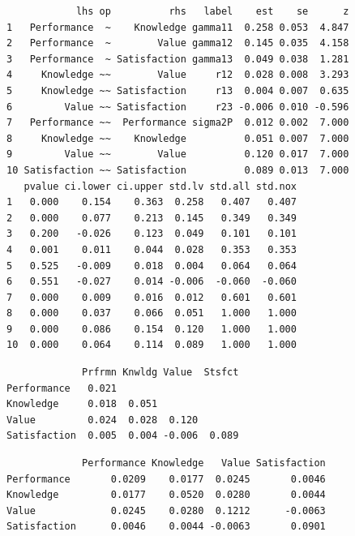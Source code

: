 \begin{verbatim}
            lhs op          rhs   label    est    se      z
1   Performance  ~    Knowledge gamma11  0.258 0.053  4.847
2   Performance  ~        Value gamma12  0.145 0.035  4.158
3   Performance  ~ Satisfaction gamma13  0.049 0.038  1.281
4     Knowledge ~~        Value     r12  0.028 0.008  3.293
5     Knowledge ~~ Satisfaction     r13  0.004 0.007  0.635
6         Value ~~ Satisfaction     r23 -0.006 0.010 -0.596
7   Performance ~~  Performance sigma2P  0.012 0.002  7.000
8     Knowledge ~~    Knowledge          0.051 0.007  7.000
9         Value ~~        Value          0.120 0.017  7.000
10 Satisfaction ~~ Satisfaction          0.089 0.013  7.000
   pvalue ci.lower ci.upper std.lv std.all std.nox
1   0.000    0.154    0.363  0.258   0.407   0.407
2   0.000    0.077    0.213  0.145   0.349   0.349
3   0.200   -0.026    0.123  0.049   0.101   0.101
4   0.001    0.011    0.044  0.028   0.353   0.353
5   0.525   -0.009    0.018  0.004   0.064   0.064
6   0.551   -0.027    0.014 -0.006  -0.060  -0.060
7   0.000    0.009    0.016  0.012   0.601   0.601
8   0.000    0.037    0.066  0.051   1.000   1.000
9   0.000    0.086    0.154  0.120   1.000   1.000
10  0.000    0.064    0.114  0.089   1.000   1.000
\end{verbatim}

\begin{Shaded}
\begin{Highlighting}[]
\OperatorTok{$}
\end{Highlighting}
\end{Shaded}

\begin{verbatim}
             Prfrmn Knwldg Value  Stsfct
Performance   0.021                     
Knowledge     0.018  0.051              
Value         0.024  0.028  0.120       
Satisfaction  0.005  0.004 -0.006  0.089
\end{verbatim}

\begin{Shaded}
\begin{Highlighting}[]
\end{Highlighting}
\end{Shaded}

\begin{verbatim}
             Performance Knowledge   Value Satisfaction
Performance       0.0209    0.0177  0.0245       0.0046
Knowledge         0.0177    0.0520  0.0280       0.0044
Value             0.0245    0.0280  0.1212      -0.0063
Satisfaction      0.0046    0.0044 -0.0063       0.0901
\end{verbatim}

